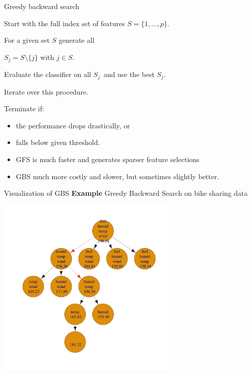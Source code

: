 \documentclass[11pt,compress,t,notes=noshow, xcolor=table]{beamer}
\begin{document}
\begin{vbframe}{Greedy backward search}

    \begin{blocki}{}
      \item Start with the full index set of features $S = \{1, \ldots, p\}$.
      \item For a given set $S$ generate all

      $S_j = S \setminus\{j\}$ with $j \in S$.
      \item Evaluate the classifier on all $S_j$\
        and use the best $S_j$.
      \item Iterate over this procedure.
      \item Terminate if:
        \begin{itemize}
          \item the performance drops drastically, or
          \item falls below given threshold.
        \end{itemize}
      \end{blocki}

      \begin{itemize}
          \item GFS is much faster and generates sparser feature selections
          \item GBS much more costly and slower, but sometimes slightly better.
      \end{itemize}

  \end{vbframe}

  \begin{frame}{Visualization of GBS}
    \textbf{Example} Greedy Backward Search on bike sharing data
    \begin{center}
      \includegraphics[width = 0.65\textwidth]{sl/feature-selection/figure/fs-wrappers-backwards-powerset-tree-4.png}
      \end{center}
\end{frame}
\end{document}
